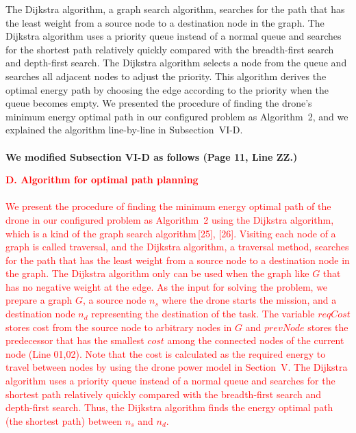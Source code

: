 \documentclass[onecolumn]{IEEEconf}
\begin{document}
\begin{description}
{    The Dijkstra algorithm, a graph search algorithm, searches for the path that has the least weight from a source node to a destination node in the graph. The Dijkstra algorithm uses a priority queue instead of a normal queue and searches for the shortest path relatively quickly compared with the breadth-first search and depth-first search. The Dijkstra algorithm selects a node from the queue and searches all adjacent nodes to adjust the priority. 
    This algorithm derives the optimal energy path by choosing the edge according to the priority when the queue becomes empty. We presented the procedure of finding the drone's minimum energy optimal path in our configured problem as Algorithm~2, and we explained the algorithm line-by-line in Subsection~VI-D.
	}
	~\\
    ~\\
	\textbf{We modified Subsection VI-D as follows (Page 11, Line ZZ.)}
    \begin{mdframed} [linewidth=.75pt, userdefinedwidth=0.9\textwidth]
    \textbf{\textcolor{red}{D. Algorithm for optimal path planning}}~\\
    ~\\
    \textcolor{red}{
    We present the procedure of finding the minimum energy optimal path of the drone in our configured problem as Algorithm~2 using the Dijkstra algorithm, which is a kind of the graph search algorithm\,[25], [26].
    Visiting each node of a graph is called traversal, and the Dijkstra algorithm, a traversal method, searches for the path that has the least weight from a source node to a destination node in the graph. The Dijkstra algorithm only can be used when the graph like $G$ that has no negative weight at the edge.
    As the input for solving the problem, we prepare a graph $G$, a source node $n_s$ where the drone starts the mission, and a destination node $n_d$ representing the destination of the task.
    The variable $reqCost$ stores cost from the source node to arbitrary nodes in $G$ and $prevNode$ stores the predecessor that has the smallest $cost$ among the connected nodes of the current node (Line 01,02). 
    Note that the cost is calculated as the required energy to travel between nodes by using the drone power model in Section~V.
    The Dijkstra algorithm uses a priority queue instead of a normal queue and searches for the shortest path relatively quickly compared with the breadth-first search and depth-first search.
    Thus, the Dijkstra algorithm finds the energy optimal path (the shortest path) between $n_s$ and $n_d$.}
    ~\\

\end{mdframed}
\end{description}
\end{document}
